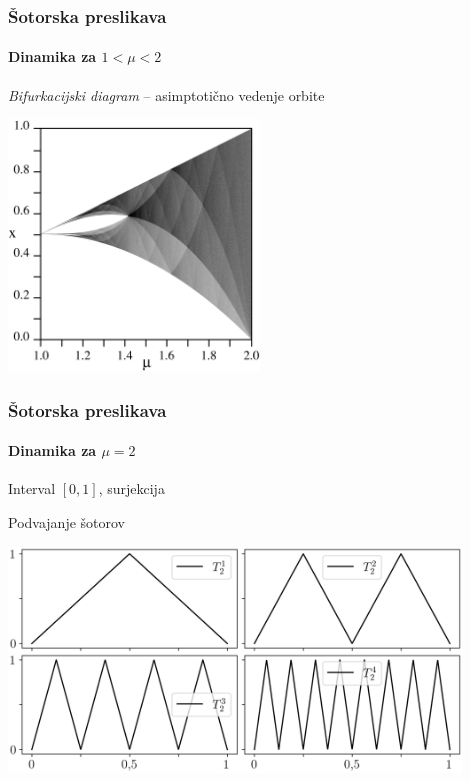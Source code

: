 \documentclass[12pt]{beamer}
\begin{document}
\begin{frame}
\frametitle{Šotorska preslikava}
\framesubtitle{Dinamika za $1 < \mu < 2$}

\emph{Bifurkacijski diagram} -- asimptotično vedenje orbite

\bigskip

\centering
\includegraphics[width=0.5\textwidth]{tent_bifurcation.png}

\end{frame}


\begin{frame}
\frametitle{Šotorska preslikava}
\framesubtitle{Dinamika za $\mu = 2$}

Interval $[0,1]$, surjekcija

\medskip

Podvajanje šotorov

\bigskip

\includegraphics[width=0.9\textwidth]{tent_2.png}

\end{frame}
\end{document}
